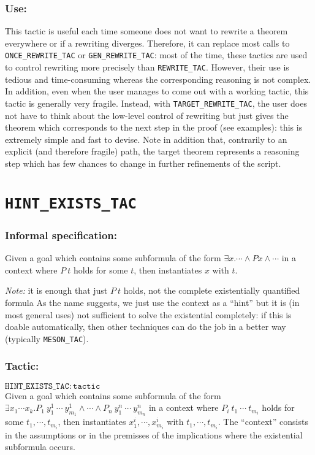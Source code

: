 \documentclass{llncs}
\newcommand*\REWRITETAC{\texttt{REWRITE\_TAC}\xspace}
\newcommand*\ONCETAC{\texttt{ONCE\_REWRITE\_TAC}\xspace}
\newcommand*\GENTAC{\texttt{GEN\_REWRITE\_TAC}\xspace}
\newcommand*\MESON{\texttt{MESON\_TAC}\xspace}
\newcommand*\TARGETTAC{\texttt{TARGET\_REWRITE\_TAC}\xspace}
\newcommand*\HINTTAC{\texttt{HINT\_EXISTS\_TAC}\xspace}
\begin{document}
    \subsubsection{Use:} This tactic is useful each time someone does not want to rewrite a theorem everywhere
    or if a rewriting diverges.
    Therefore, it can replace most calls to \ONCETAC or \GENTAC:
    most of the time, these tactics are used to control rewriting more precisely than \REWRITETAC.
    However, their use is tedious and time-consuming whereas the corresponding reasoning is not complex.
    In addition, even when the user manages to come out with a working tactic,
    this tactic is generally very fragile.
    Instead, with \TARGETTAC, the user does not have to think about the low-level control of rewriting
    but just gives the theorem which corresponds to the next step in the proof (see examples):
    this is extremely simple and fast to devise.
    Note in addition that, contrarily to an explicit (and therefore fragile) path,
    the target theorem represents a reasoning step which has few chances to change in further refinements
    of the script.


  \section{\HINTTAC}

		\subsubsection{Informal specification:}
    Given a goal which contains some subformula of the form $\exists x. \cdots \wedge P x \wedge \cdots$
    in a context where $P\ t$ holds for some $t$, then instantiates $x$ with $t$.

    \emph{Note:} it is enough that just $P\ t$ holds, not the complete existentially quantified formula
    As the name suggests, we just use the context as a ``hint'' but it is (in most general uses)
    not sufficient to solve the existential completely: if this is doable automatically,
    then other techniques can do the job in a better way (typically \MESON).

		\subsubsection{Tactic:} 
		$\mathtt{\HINTTAC: tactic}$\\
    Given a goal which contains some subformula of the form
    $\exists x_1\cdots x_k. P_1\ y^1_1\ \cdots\ y^1_{m_1} \wedge \cdots \wedge P_n\ y^n_1\ \cdots\ y^n_{m_n}$
    in a context where $P_i\ t_1\ \cdots\ t_{m_i}$ holds for some $t_1,\cdots,t_{m_i}$,
    then instantiates $x^i_1,\cdots,x^i_{m_i}$ with $t_1,\cdots,t_{m_i}$.
    The ``context'' consists in the assumptions or in the premisses of the implications where
    the existential subformula occurs.
\end{document}
